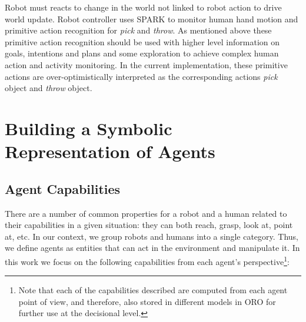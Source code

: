 \documentclass{svmult}
\begin{document}
Robot must reacts to change in the world not linked to robot
action to drive world update. Robot controller uses SPARK to monitor human hand
motion and primitive action recognition for \emph{pick} and \emph{throw}. As
mentioned above these primitive action recognition should be used with higher
level information on goals, intentions and plans and some exploration to
achieve complex human action and activity monitoring.  In the current
implementation, these primitive actions are over-optimistically interpreted as
the corresponding actions \emph{pick} object and \emph{throw} object.





\section{Building a Symbolic Representation of Agents}
\label{grounding_agents}


\subsection{Agent Capabilities}

There are a number of common properties for a robot and a human related to
their capabilities in a given situation: they can both reach, grasp, look at,
point at, etc. In our context, we group robots and humans into a single category.
Thus, we define agents as entities that can act in the environment and
manipulate it. In this work we focus on the following capabilities from each
agent's perspective\footnote{Note that each of the capabilities described are
computed from each agent point of view, and therefore, also stored in different
models in ORO for further use at the decisional level.}:
\end{document}

